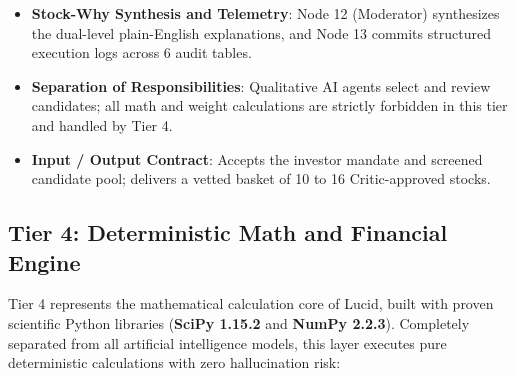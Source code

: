 \begin{itemize}
    \item \textbf{Stock-Why Synthesis and Telemetry}: Node 12 (Moderator) synthesizes the dual-level plain-English explanations, and Node 13 commits structured execution logs across 6 audit tables.
    \item \textbf{Separation of Responsibilities}: Qualitative AI agents select and review candidates; all math and weight calculations are strictly forbidden in this tier and handled by Tier 4.
    \item \textbf{Input / Output Contract}: Accepts the investor mandate and screened candidate pool; delivers a vetted basket of 10 to 16 Critic-approved stocks.
\end{itemize}

\subsection{Tier 4: Deterministic Math and Financial Engine}
Tier 4 represents the mathematical calculation core of Lucid, built with proven scientific Python libraries (\textbf{SciPy 1.15.2} and \textbf{NumPy 2.2.3}). Completely separated from all artificial intelligence models, this layer executes pure deterministic calculations with zero hallucination risk:
